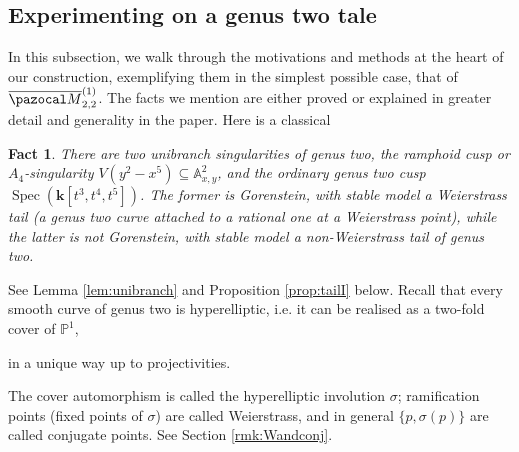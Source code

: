 \documentclass{compositio}
\newcommand{\PP}{\mathbb P}
\renewcommand{\k}{\mathbf k}
\newcommand{\Aaff}{\mathbb A}
\newcommand{\oM}{\overline{\pazocal M}}
\theoremstyle{plain}
\newtheorem*{fact}{Fact}
\theoremstyle{definition}
\theoremstyle{remark}
\begin{document}
\subsection{Experimenting on a genus two tale}  In this subsection, we walk through the motivations and methods at the heart of our construction, exemplifying them in the simplest possible case, that of $\oM_{2,2}^{(1)}$. The facts we mention are either proved or explained in greater detail and generality in the paper. Here is a classical
\begin{fact}
 There are two unibranch singularities of genus two, the \emph{ramphoid cusp} or \emph{$A_4$-singularity} $V(y^2-x^5)\subseteq \Aaff^2_{x,y}$, and the ordinary genus two cusp $\operatorname{Spec}(\k[t^3,t^4,t^5])$. The former is Gorenstein, with stable model a Weierstrass tail (a genus two curve attached to a rational one at a Weierstrass point), while the latter is not Gorenstein, with stable model a non-Weierstrass tail of genus two.
\end{fact}
See Lemma \ref{lem:unibranch} and Proposition \ref{prop:tailI} below. Recall that every smooth curve of genus two is hyperelliptic, i.e. it can be realised as a two-fold cover of $\PP^1$, 

in a unique way up to projectivities. 

The cover automorphism is called the hyperelliptic involution $\sigma$; ramification points (fixed points of $\sigma$) are called Weierstrass, and in general $\{p,\sigma(p)\}$ are called conjugate points. See Section \ref{rmk:Wandconj}.
\end{document}
